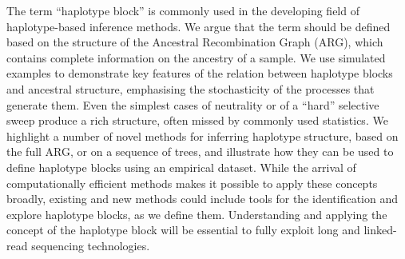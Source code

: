 \documentclass[twocolumn]{bmcart}%
\begin{document}
\begin{frontmatter}
\begin{abstractbox}
The term “haplotype block” is commonly used in the developing field of haplotype-based inference methods. We argue that the term should be defined based on the structure of the Ancestral Recombination Graph (ARG), which contains complete information on the ancestry of a sample. We use simulated examples to demonstrate key features of the relation between haplotype blocks and ancestral structure, emphasising the stochasticity of the processes that generate them. Even the simplest cases of neutrality or of a “hard” selective sweep produce a rich structure, often missed by commonly used statistics. We highlight a number of novel methods for inferring haplotype structure, based on the full ARG, or on a sequence of trees, and illustrate how they can be used to define haplotype blocks using an empirical dataset. While the arrival of computationally efficient methods makes it possible to apply these concepts broadly, existing and new methods could include tools for the identification and explore haplotype blocks, as we define them. Understanding and applying the concept of the haplotype block will be essential to fully exploit long and linked-read sequencing technologies.

%



\begin{keyword}
\end{keyword}


\end{abstractbox}
%

\end{frontmatter}
\end{document}
